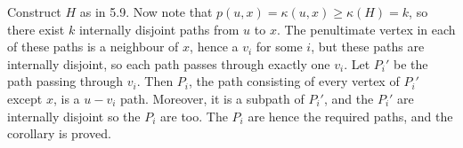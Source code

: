 Construct $H$ as in 5.9. Now note that $p(u,x)=\kappa(u,x)\ge \kappa(H)=k$,
so there exist $k$ internally disjoint paths from $u$ to $x$. The
penultimate vertex in each of these paths is a neighbour of $x$, hence 
a $v_i$ for some $i$, but these paths are internally disjoint, so each path
passes through exactly one $v_i$. Let $P_i'$ be the path passing through
$v_i$. Then $P_i$, the path consisting of every vertex of $P_i'$ except $x$,
is a $u-v_i$ path. Moreover, it is a subpath of $P_i'$, and the $P_i'$ are
internally disjoint so the $P_i$ are too. The $P_i$ are hence the required
paths, and the corollary is proved.
